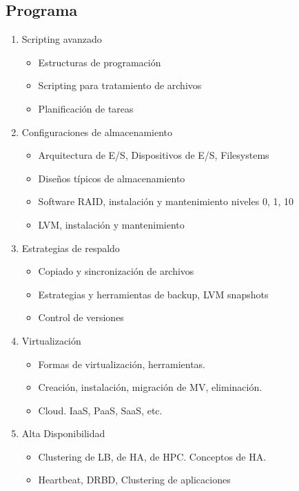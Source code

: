 \subsection {Programa}
\begin{enumerate}
\item Scripting avanzado
\begin{itemize}
	\item Estructuras de programación
	\item Scripting para tratamiento de archivos
	\item Planificación de tareas
\end{itemize}

\item Configuraciones de almacenamiento
\begin{itemize}
	\item Arquitectura de E/S, Dispositivos de E/S, Filesystems
	\item	Diseños típicos de almacenamiento
	\item	Software RAID, instalación y mantenimiento niveles 0, 1, 10
	\item	LVM, instalación y mantenimiento	 
\end{itemize}
	
\item Estrategias de respaldo
\begin{itemize}
	\item Copiado y sincronización de archivos
	\item Estrategias y herramientas de backup, LVM snapshots
	\item Control de versiones
\end{itemize}
\item Virtualización
\begin{itemize}
	\item Formas de virtualización, herramientas. 
	\item Creación, instalación, migración de MV, eliminación. 
	\item Cloud. IaaS, PaaS, SaaS, etc.
\end{itemize}
\item Alta Disponibilidad
\begin{itemize}
	\item Clustering de LB, de HA, de HPC. Conceptos de HA.
	\item Heartbeat, DRBD, Clustering de aplicaciones
\end{itemize}
\end{enumerate}

